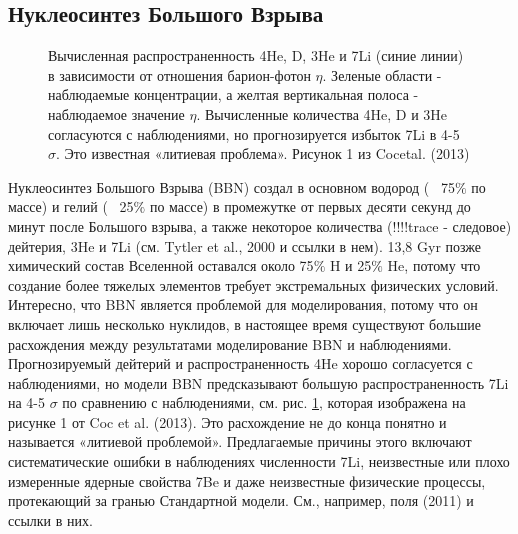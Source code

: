 \documentclass[%
bachelor,    %
natbib,      %
subf,        %
href,        %
colorlinks,  %
]{disser}
\begin{document}
\subsection{Нуклеосинтез Большого Взрыва}
\begin{figure}[h]
	\caption{Вычисленная распространенность 4He, D, 3He и 7Li (синие линии) в зависимости от отношения барион-фотон $\eta$. Зеленые области - наблюдаемые концентрации, а желтая вертикальная полоса - наблюдаемое значение $\eta$. Вычисленные количества 4He, D и 3He согласуются с наблюдениями, но прогнозируется избыток 7Li в 4-5 $\sigma$. Это известная «литиевая проблема». Рисунок 1 из Cocetal. (2013)}
	\label{ris:2}
\end{figure}
Нуклеосинтез Большого Взрыва (BBN) создал в основном водород (~ 75$\%$ по массе) и гелий (~ 25$\%$ по массе) в промежутке от первых десяти секунд до минут после Большого взрыва, а также некоторое количества (!!!!trace - следовое) дейтерия, 3He и 7Li (см. Tytler et al., 2000 и ссылки в нем). 13,8 Gyr позже химический состав Вселенной оставался около 75$\%$ H и 25$\%$ He, потому что создание более тяжелых элементов требует экстремальных физических условий. Интересно, что BBN является проблемой для моделирования, потому что он включает лишь несколько нуклидов, в настоящее время существуют большие расхождения между результатами моделирование BBN и наблюдениями. Прогнозируемый дейтерий и распространенность 4He хорошо согласуется с наблюдениями, но модели BBN предсказывают большую распространенность 7Li на 4-5 $\sigma$ по сравнению с наблюдениями, см. рис. \ref{ris:2}, которая изображена на рисунке 1 от Coc et al. (2013). Это расхождение не до конца понятно и называется «литиевой проблемой». Предлагаемые причины этого включают систематические ошибки в наблюдениях численности 7Li, неизвестные или плохо измеренные ядерные свойства 7Be и даже неизвестные физические процессы, протекающий за гранью Стандартной модели.
См., например, поля (2011) и ссылки в них.
\end{document}
